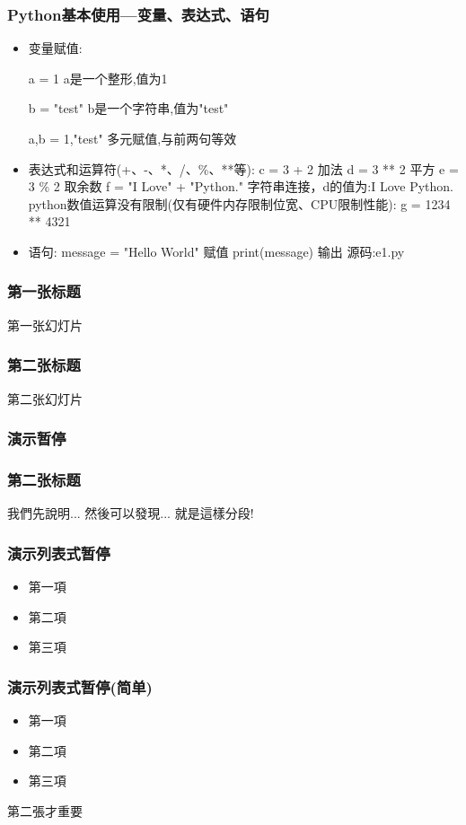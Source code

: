 \documentclass[xcolor=dvipsnames]{beamer}
\begin{document}
\begin{frame}
    \frametitle{Python基本使用—变量、表达式、语句}
    \begin{itemize}[<+->]
        \item 变量赋值: 
            \begin{semiverbatim} 
            a = 1           a是一个整形,值为1

            b = "test"      b是一个字符串,值为"test"

            a,b = 1,"test"  \alert{多元赋值},与前两句等效
            \end{semiverbatim} 
        \item 表达式和运算符(+、-、*、/、\%、**等):
            c = 3 + 2       加法
            d = 3 ** 2      平方
            e = 3 \% 2      取余数
            f = "I Love" + "Python." 字符串连接，d的值为:I Love Python.
            python数值运算没有限制(仅有硬件内存限制位宽、CPU限制性能):
            g = 1234 ** 4321
        \item 语句:
            message = "Hello World"   赋值
            print(message)            输出
            源码:e1.py
    \end{itemize} 
\end{frame}

\begin{frame}
    \frametitle{第一张标题}
    第一张幻灯片
\end{frame}

\begin{frame}
    \frametitle{第二张标题}
    第二张幻灯片
\end{frame}

\begin{frame}
    \frametitle{演示暂停}
    \frametitle{第二张标题}
    我們先說明...  
    \pause 
    然後可以發現...  
    \pause 
    就是這樣分段! 
\end{frame}

\begin{frame}
    \frametitle{演示列表式暂停}
    \begin{itemize}
        \item 
            第一項 
            \pause
        \item 
            第二項 
            \pause 
        \item 
            第三項 
    \end{itemize} 
\end{frame}

\begin{frame}
    \frametitle{演示列表式暂停(简单)}
    \begin{itemize}[<+->]
        \item
            第一項
        \item
            第二項
        \item
            第三項
    \end{itemize} 
    \alert<2>{第二張}才重要
\end{frame}
\end{document}
